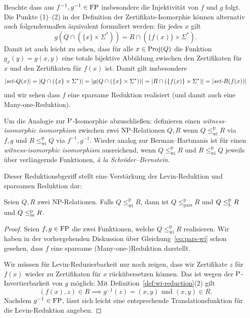 Beachte dass aus $f^{-1},g^{-1}\in\FP$ insbesondere die Injektivität von $f$ und $g$ folgt.
Die Punkte (1)--(2) in der Definition der Zertifikats-Isomorphie können alternativ auch folgendermaßen äquivalent formuliert werden:  für jedes $x$ gilt
\begin{equation}\label{eq:pars-wi} g(Q\cap(\{x\}\times\Sigma^*))  = R \cap (\{f(x)\}\times\Sigma^*).  \end{equation}
Damit ist auch leicht zu sehen, dass für alle $x\in\Proj(Q)$ die Funktion $g_x(y)= g(x,y)$ eine totale bijektive Abbildung zwischen den Zertifikaten für $x$ und den Zertifikaten für $f(x)$ ist. 
Damit gilt insbesondere
\[ |\fset{}Q(x)|=|Q\cap(\{x\}\times\Sigma^*)|=|g(Q\cap(\{x\}\times\Sigma^*))|=|R \cap (\{f(x)\}\times\Sigma^*)|=|\fset{}R(f(x))| \]
und wir sehen dass $f$ eine sparsame Reduktion realisiert (und damit auch eine Many-one-Reduktion).

Um die Analogie zur $\P$-Isomorphie abzuschließen: \citeauthor{wiedermann_witness-isomorphic_1995} definieren einen \emph{witness-isomorphic isomorphism} zwischen zwei NP-Relationen $Q, R$ wenn $Q\leq_\mathrm{wi}^\mathrm p R$ via $f,g$ und $R\leq_\mathrm{wi}^\mathrm p Q$ via $f^{-1}, g^{-1}$. Wieder analog zur Berman--Hartmanis ist für einen \emph{witness-isomorphic isomorphism} ausreichend, wenn $Q\leq_\mathrm{wi}^\mathrm p R$ und $R\leq_\mathrm{wi}^\mathrm p Q$ jeweils über verlängernde Funktionen, \emph{à la Schröder--Bernstein}.

Dieser Reduktionsbgeriff stellt eine Verstärkung der Levin-Reduktion und sparsamen Reduktion dar:
\begin{lemma}\label{lemma:wi-reduction}
    Seien $Q, R$ zwei NP-Relationen. Falls $Q\leq_\mathrm{wi}^\mathrm p R$, dann ist $Q\leq_\mathrm{pars}^\mathrm p R$ und $Q\leqlp R$ und $Q\leqmp R$.
\end{lemma}
\begin{proof}
    Seien $f,g\in \FP$ die zwei Funktionen, welche $Q\leq_\mathrm{wi}^\mathrm p R$ realisieren.
    Wir haben in der vorhergehenden Diskussion über Gleichung~\ref{eq:pars-wi} schon gesehen, dass $f$ eine sparsame (Many-one-)Reduktion darstellt.

    Wir müssen für Levin-Reduzierbarkeit nur noch zeigen, dass wir Zertifikate $z$ für $f(x)$ wieder zu Zertifikaten für $x$ rückübersetzen können. Das ist wegen der $\P$-Invertierbarkeit von $g$ möglich:
    Mit Definition~\ref{def:wi-reduction}(2) gilt
    \[ (f(x), z) \in R \implies g^{-1}(z)=(x,y) \text{ und } (x,y)\in R. \]
    Nachdem $g^{-1}\in\FP$, lässt sich leicht eine entsprechende Translationsfunktion für die Levin-Reduktion angeben.
\end{proof}

